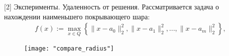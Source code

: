 \begin{frame}{[2] Эксперименты. Удаленность от решения.}
    Рассматривается задача о нахождении наименьшего покрывающего шара:
    \begin{gather}\label{sphere_cover_strongly}
        f(x) := \max_{x\in Q}\left\{\|x - a_0\|_2^2, \|x - a_1\|_2^2, ..., \|x - a_m\|_2^2\right\},
    \end{gather}
    \begin{figure}
        \centering
        \texttt{[image: "compare\_radius"]}
    \end{figure}
\end{frame}


        



